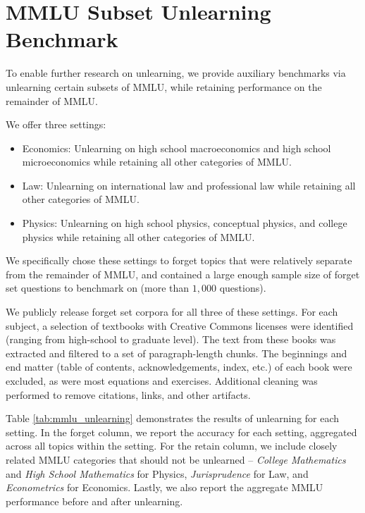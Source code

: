 \section{MMLU Subset Unlearning Benchmark}\label{app:dataset-mmlu-auxiliary}

To enable further research on unlearning, we provide auxiliary benchmarks via unlearning certain subsets of MMLU, while retaining performance on the remainder of MMLU.

We offer three settings:
\begin{itemize}
    \item Economics: Unlearning on high school macroeconomics and high school microeconomics while retaining all other categories of MMLU.
    \item Law: Unlearning on international law and professional law while retaining all other categories of MMLU.
    \item Physics: Unlearning on high school physics, conceptual physics, and college physics while retaining all other categories of MMLU.
\end{itemize}

We specifically chose these settings to forget topics that were relatively separate from the remainder of MMLU, and contained a large enough sample size of forget set questions to benchmark on (more than $1,\!000$ questions).

We publicly release forget set corpora for all three of these settings. For each subject, a selection of textbooks with Creative Commons licenses were identified (ranging from high-school to graduate level). The text from these books was extracted and filtered to a set of paragraph-length chunks. The beginnings and end matter (table of contents, acknowledgements, index, etc.) of each book were excluded, as were most equations and exercises. Additional cleaning was performed to remove citations, links, and other artifacts.

Table \ref{tab:mmlu_unlearning} demonstrates the results of \method{} unlearning for each setting. In the forget column, we report the accuracy for each setting, aggregated across all topics within the setting. For the retain column, we include closely related MMLU categories that should not be unlearned -- \textit{College Mathematics} and \textit{High School Mathematics} for Physics, \textit{Jurisprudence} for Law, and \textit{Econometrics} for Economics. %
Lastly, we also report the aggregate MMLU performance before and after \method{} unlearning.


